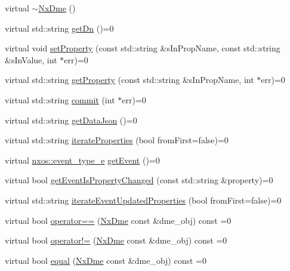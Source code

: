 \begin{DoxyCompactItemize}
\item 
virtual \mbox{\hyperlink{classnxos_1_1_nx_dme_a8dc547fb29c4db31558f05566cde616d}{$\sim$\+Nx\+Dme}} ()
\item 
virtual std\+::string \mbox{\hyperlink{classnxos_1_1_nx_dme_ad97ecb092308dcacdd5de64327742210}{get\+Dn}} ()=0
\item 
virtual void \mbox{\hyperlink{classnxos_1_1_nx_dme_a353542ba7f8354730b78dd50659c0c30}{set\+Property}} (const std\+::string \&s\+In\+Prop\+Name, const std\+::string \&s\+In\+Value, int $\ast$err)=0
\item 
virtual std\+::string \mbox{\hyperlink{classnxos_1_1_nx_dme_af4a2a0bb41b6be55593e8624700a2d6d}{get\+Property}} (const std\+::string \&s\+In\+Prop\+Name, int $\ast$err)=0
\item 
virtual std\+::string \mbox{\hyperlink{classnxos_1_1_nx_dme_a61e01267ff642ace49a8fe75296a0cbd}{commit}} (int $\ast$err)=0
\item 
virtual std\+::string \mbox{\hyperlink{classnxos_1_1_nx_dme_a846519c8ee7521dac1c7e6c961903b0f}{get\+Data\+Json}} ()=0
\item 
virtual std\+::string \mbox{\hyperlink{classnxos_1_1_nx_dme_abb7ee373c1fe3a50b52a243be2f9a863}{iterate\+Properties}} (bool from\+First=false)=0
\item 
virtual \mbox{\hyperlink{namespacenxos_af9a9040b7681199d386e94eb888018cb}{nxos\+::event\+\_\+type\+\_\+e}} \mbox{\hyperlink{classnxos_1_1_nx_dme_aff302a3891e0b6f69e9e0fd26e6e16a7}{get\+Event}} ()=0
\item 
virtual bool \mbox{\hyperlink{classnxos_1_1_nx_dme_a6f7052ff8ef29df2f692dbfdb3a8c987}{get\+Event\+Is\+Property\+Changed}} (const std\+::string \&property)=0
\item 
virtual std\+::string \mbox{\hyperlink{classnxos_1_1_nx_dme_a2fe8b05c2c14f16ad7a2f4002a63baf2}{iterate\+Event\+Updated\+Properties}} (bool from\+First=false)=0
\item 
virtual bool \mbox{\hyperlink{classnxos_1_1_nx_dme_a847650a963a30b0cad5969cac7ecb9bc}{operator==}} (\mbox{\hyperlink{classnxos_1_1_nx_dme}{Nx\+Dme}} const \&dme\+\_\+obj) const =0
\item 
virtual bool \mbox{\hyperlink{classnxos_1_1_nx_dme_a8d1ffa9c69d24635fb28b52549ab666c}{operator!=}} (\mbox{\hyperlink{classnxos_1_1_nx_dme}{Nx\+Dme}} const \&dme\+\_\+obj) const =0
\item 
virtual bool \mbox{\hyperlink{classnxos_1_1_nx_dme_a3bbd85bc12faba3ee4737abaa907e4e5}{equal}} (\mbox{\hyperlink{classnxos_1_1_nx_dme}{Nx\+Dme}} const \&dme\+\_\+obj) const =0
\end{DoxyCompactItemize}


